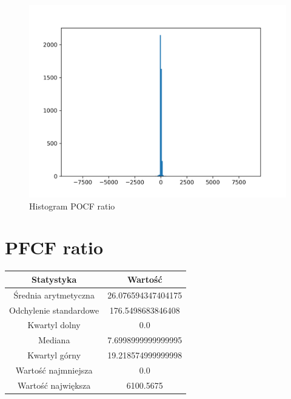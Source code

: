 \documentclass{article}
\begin{document}
\begin{figure}[h!]
    \includegraphics[width=\linewidth]{variables/POCF ratio.png}
    \caption{Histogram POCF ratio }
\end{figure}\section{ PFCF ratio }

\begin{center}
    \begin{tabular}{|c | c|} 
    \hline
    Statystyka & Wartość \\
    \hline\hline
    Średnia arytmetyczna & 26.076594347404175 \\ 
    \hline
    Odchylenie standardowe & 176.5498683846408 \\
    \hline
    Kwartyl dolny & 0.0 \\
    \hline
    Mediana & 7.6998999999999995 \\
    \hline
    Kwartyl górny & 19.218574999999998 \\
    \hline
    Wartość najmniejsza & 0.0 \\
    \hline
    Wartość największa & 6100.5675 \\
    \hline
   \end{tabular}
\end{center}
\end{document}
